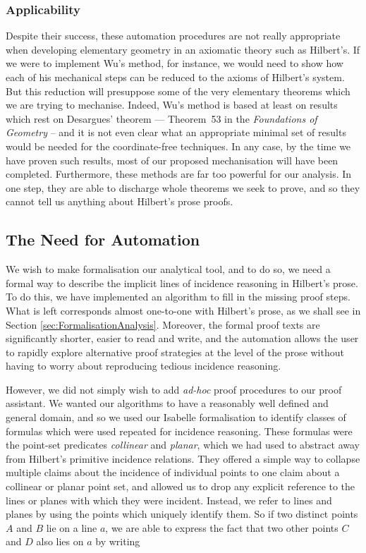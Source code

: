 \subsubsection{Applicability}
Despite their success, these automation procedures are not really appropriate when developing elementary geometry in an axiomatic theory such as Hilbert's. If we were to implement Wu's method, for instance, we would need to show how each of his mechanical steps can be reduced to the axioms of Hilbert's system. But this reduction will presuppose some of the very elementary theorems which we are trying to mechanise. Indeed, Wu's method is based at least on results which rest on Desargues' theorem --- Theorem~53 in the \emph{Foundations of Geometry} -- and it is not even clear what an appropriate minimal set of results would be needed for the coordinate-free techniques. In any case, by the time we have proven such results, most of our proposed mechanisation will have been completed. Furthermore, these methods are far too powerful for our analysis. In one step, they are able to discharge whole theorems we seek to prove, and so they cannot tell us anything about Hilbert's prose proofs.

\subsection{The Need for Automation}
We wish to make formalisation our analytical tool, and to do so, we need a formal way to describe the implicit lines of incidence reasoning in Hilbert's prose. To do this, we have implemented an algorithm to fill in the missing proof steps. What is left corresponds almost one-to-one with Hilbert's prose, as we shall see in Section \ref{sec:FormalisationAnalysis}. Moreover, the formal proof texts are significantly shorter, easier to read and write, and the automation allows the user to rapidly explore alternative proof strategies at the level of the prose without having to worry about reproducing tedious incidence reasoning. 

However, we did not simply wish to add \emph{ad-hoc} proof procedures to our proof assistant. We wanted our algorithms to have a reasonably well defined and general domain, and so we used our Isabelle formalisation to identify classes of formulas which were used repeated for incidence reasoning. These formulas were the point-set predicates \emph{collinear} and \emph{planar}, which we had used to abstract away from Hilbert's primitive incidence relations. They offered a simple way to collapse multiple claims about the incidence of individual points to one claim about a collinear or planar point set, and allowed us to drop any explicit reference to the lines or planes with which they were incident. Instead, we refer to lines and planes by using the points which uniquely identify them. So if two distinct points $A$ and $B$ lie on a line $a$, we are able to express the fact that two other points $C$ and $D$ also lies on $a$ by writing

